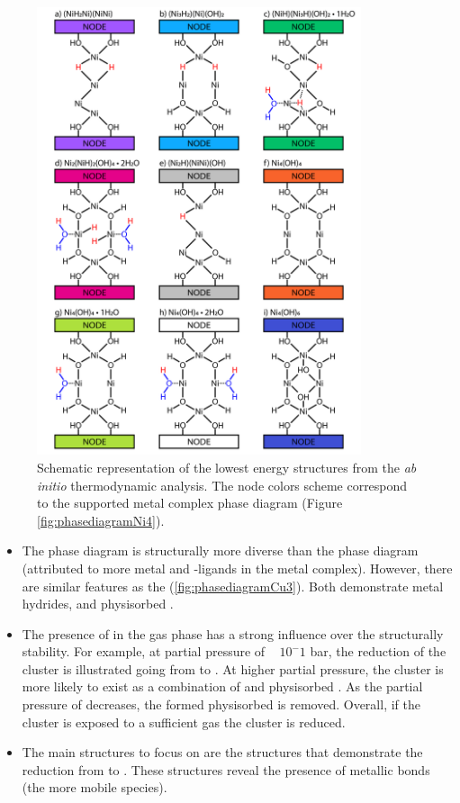 \documentclass[journal=jctcce,manuscript=article]{achemso}
\begin{document}
\begin{figure}[H]
    \centering
    \includegraphics[width=0.85\textwidth]{zi-images/01-Ni-Graphics/2020-08-31-StructureDiagram-V01.png}
    \caption{Schematic representation of the lowest energy structures from the \textit{ab initio} thermodynamic analysis. The node colors scheme correspond to the  supported metal complex phase diagram (Figure \ref{fig:phasediagramNi4}).}
    \label{fig:structurediagramNi4}
\end{figure}

\begin{itemize}
    \item The  phase diagram is structurally more diverse than the  phase diagram (attributed to more metal and -ligands in the  metal complex). However, there are similar features as the (\ref{fig:phasediagramCu3}). Both demonstrate metal hydrides, and physisorbed .
    \item The presence of  in the gas phase has a strong influence over the structurally stability. For example, at  partial pressure of ~ $10^-1$ bar, the reduction of the cluster is illustrated going from  to . At higher  partial pressure, the cluster is more likely to exist as a combination of  and physisorbed . As the partial pressure of  decreases, the formed physisorbed  is removed. Overall, if the cluster is exposed to a sufficient  gas the cluster is reduced. 
    \item The main structures to focus on are the structures that demonstrate the  reduction from  to . These structures reveal the presence of metallic  bonds (the more mobile species).
\end{itemize}
\end{document}
